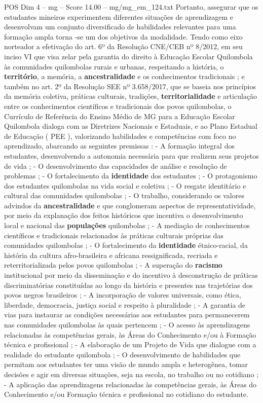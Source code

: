\begin{textsample}{POS Dim 4 – mg – Score 14.00 – mg/mg\_em\_124.txt}
Portanto, assegurar que os estudantes mineiros experimentem diferentes situações de aprendizagem e desenvolvam um conjunto diversificado de habilidades relevantes para uma formação ampla torna -se um dos objetivos da modalidade.
Tendo como eixo norteador a efetivação do art. 6º da Resolução CNE/CEB nº 8/2012, em seu inciso VI que visa zelar pela garantia do direito à Educação Escolar Quilombola às comunidades quilombolas rurais e urbanas, respeitando a história, o \textbf{território}, a memória, a \textbf{ancestralidade} e os conhecimentos tradicionais ; e também no art. 2º da Resolução SEE nº 3.658/2017, que se baseia nos princípios da memória coletiva, práticas culturais, tradições, \textbf{territorialidade} e articulação entre os conhecimentos científicos e tradicionais dos povos quilombolas, o Currículo de Referência do Ensino Médio de MG para a Educação Escolar Quilombola dialoga com as Diretrizes Nacionais e Estaduais, e ao Plano Estadual de Educação ( PEE ), valorizando habilidades e competências com foco no aprendizado, abarcando as seguintes premissas : - A formação integral dos estudantes, desenvolvendo a autonomia necessária para que realizem seus projetos de vida ; - O desenvolvimento das capacidades de análise e resolução de problemas ; - O fortalecimento da \textbf{identidade} dos estudantes ; - O protagonismo dos estudantes quilombolas na vida social e coletiva ; - O resgate identitário e cultural das comunidades quilombolas ; - O trabalho, considerando os valores advindos da \textbf{ancestralidade} e que conglomeram aspectos de representatividade, por meio da explanação dos feitos históricos que incentiva o desenvolvimento local e nacional das \textbf{populações} quilombolas ; - A mediação de conhecimentos científicos e tradicionais relacionados às práticas culturais próprias das comunidades quilombolas ; - O fortalecimento da \textbf{identidade} étnico-racial, da história da cultura afro-brasileira e africana ressignificada, recriada e reterritorializada pelos povos quilombolas ; - A superação do \textbf{racismo} institucional por meio da disseminação e do incentivo à desconstrução de práticas discriminatórias constituídas ao longo da história e presentes nas trajetórias dos povos negros brasileiros ; - A incorporação de valores universais, como ética, liberdade, democracia, justiça social e respeito à pluralidade ; - A garantia de vias para instaurar as condições necessárias aos estudantes para permanecerem nas comunidades quilombolas às quais pertencem ; - O acesso às aprendizagens relacionadas às competências gerais, às Áreas do Conhecimento e/ou à Formação técnica e profissional ; - A elaboração de um Projeto de Vida que dialogue com a realidade do estudante quilombola ; - O desenvolvimento de habilidades que permitam aos estudantes ter uma visão de mundo ampla e heterogênea, tomar decisões e agir em diversas situações, seja na escola, no trabalho ou no cotidiano ; - A aplicação das aprendizagens relacionadas às competências gerais, às Áreas do Conhecimento e/ou Formação técnica e profissional no cotidiano do estudante.

\end{textsample}
